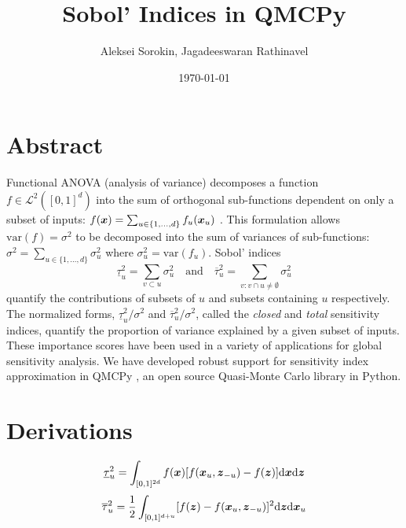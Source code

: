 \documentclass{article}
\title{Sobol' Indices in QMCPy}
\author{Aleksei Sorokin, Jagadeeswaran Rathinavel}
\date{\today}
\begin{document}
\maketitle

\section{Abstract}
Functional ANOVA (analysis of variance) decomposes a function $f \in \mathcal{L}^2([0,1]^d)$ into the sum of orthogonal sub-functions dependent on only a subset of inputs: $f(\boldsymbol{x}) = \sum_{u \in \{1,\dots,d\}} f_u(\boldsymbol{x}_u)$ \cite[Appendix A]{mcbook}. This formulation allows $\text{var}(f)=\sigma^2$ to be decomposed into the sum of variances of sub-functions: $\sigma^2 = \sum_{u \in \{1,\dots,d\}} \sigma^2_u$ where $\sigma^2_u = \text{var}(f_u)$. Sobol' indices 
$$\underline{\tau}_u^2 = \sum_{v \subset u} \sigma^2_u \quad \text{and} \quad  \overline{\tau}_u^2 = \sum_{v: v \cap u \neq \emptyset} \sigma^2_u$$ quantify the contributions of subsets of $u$ and subsets containing $u$ respectively. The normalized forms, $\underline{\tau}_u^2/\sigma^2$ and  $\overline{\tau}_u^2/\sigma^2$, called the \emph{closed} and \emph{total} sensitivity indices, quantify the proportion of variance explained by a given subset of inputs. These importance scores have been used in a variety of applications for global sensitivity analysis. We have developed robust support for sensitivity index approximation in QMCPy \cite{QMCPy}, an open source Quasi-Monte Carlo library in Python. 

\section{Derivations}

\begin{equation}
    \underline{\tau}_u^2 = \int_{[0,1]^{2d}} f(\boldsymbol{x})[f(\boldsymbol{x}_u,\boldsymbol{z}_{-u})-f(\boldsymbol{z})]\mathrm{d}\boldsymbol{x}\mathrm{d}\boldsymbol{z}
    \label{eq:si_closed}
\end{equation}
\begin{equation}
    \overline{\tau}_u^2 = \frac{1}{2}\int_{[0,1]^{d+u}} [f(\boldsymbol{z})-f(\boldsymbol{x}_u,\boldsymbol{z}_{-u})]^2\mathrm{d}\boldsymbol{z}\mathrm{d}\boldsymbol{x}_u
    \label{eq:si_total}
\end{equation}

\printbibliography
\end{document}
